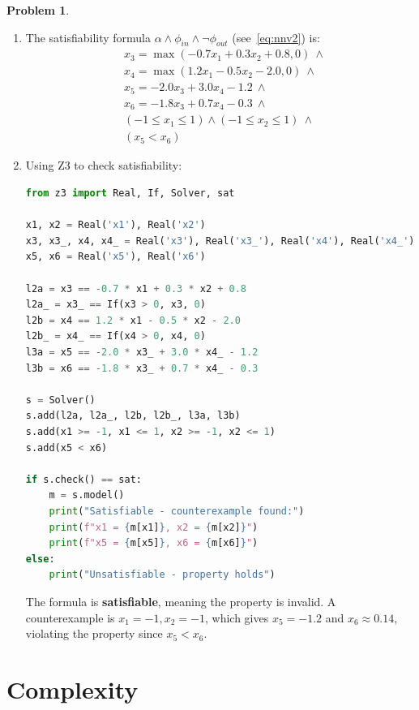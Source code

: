 \documentclass[oneside,11pt,dvipsnames]{book}
\numberwithin{equation}{section}
\theoremstyle{definition}
\newtheorem{problem}{Problem}[section]
\theoremstyle{remark}
\newenvironment{solution}{%
  \ifbool{showsol}{%
    \begin{mysolbox}%
        {\small \textbf{Solution}: }
  }{%
    \comment %
  }%
}{%
  \ifbool{showsol}{%
    \end{mysolbox}%
  }{%
    \endcomment %
  }%
}
\begin{document}
\begin{problem}
\begin{solution}
\begin{enumerate}
    \item The satisfiability formula $\alpha \land \phi_{in} \land \neg \phi_{out}$ (see~\autoref{eq:nnv2}) is:
    \begin{align*}
    & x_3 = \max(-0.7x_1 + 0.3x_2 + 0.8, 0) ~\land \\
    & x_4 = \max(1.2x_1 - 0.5x_2 - 2.0, 0) ~\land \\
    & x_5 = -2.0x_3 + 3.0x_4 - 1.2 ~\land \\
    & x_6 = -1.8x_3 + 0.7x_4 - 0.3 ~\land \\
    & (-1 \le x_1 \le 1) \land (-1 \le x_2 \le 1) ~\land \\
    & (x_5 < x_6)
    \end{align*}

    \item Using Z3 to check satisfiability:
\begin{lstlisting}[language=python,breaklines=true,basicstyle=\ttfamily\small]
from z3 import Real, If, Solver, sat

x1, x2 = Real('x1'), Real('x2')
x3, x3_, x4, x4_ = Real('x3'), Real('x3_'), Real('x4'), Real('x4_')
x5, x6 = Real('x5'), Real('x6')

l2a = x3 == -0.7 * x1 + 0.3 * x2 + 0.8
l2a_ = x3_ == If(x3 > 0, x3, 0)
l2b = x4 == 1.2 * x1 - 0.5 * x2 - 2.0
l2b_ = x4_ == If(x4 > 0, x4, 0)
l3a = x5 == -2.0 * x3_ + 3.0 * x4_ - 1.2
l3b = x6 == -1.8 * x3_ + 0.7 * x4_ - 0.3

s = Solver()
s.add(l2a, l2a_, l2b, l2b_, l3a, l3b)
s.add(x1 >= -1, x1 <= 1, x2 >= -1, x2 <= 1)
s.add(x5 < x6)

if s.check() == sat:
    m = s.model()
    print("Satisfiable - counterexample found:")
    print(f"x1 = {m[x1]}, x2 = {m[x2]}")
    print(f"x5 = {m[x5]}, x6 = {m[x6]}")
else:
    print("Unsatisfiable - property holds")
\end{lstlisting}

The formula is \textbf{satisfiable}, meaning the property is invalid. A counterexample is $x_1 = -1, x_2 = -1$, which gives $x_5 = -1.2$ and $x_6 \approx 0.14$, violating the property since $x_5 < x_6$.
\end{enumerate}
\end{solution}
\end{problem}

\section{Complexity}\label{sec:complexity}
\end{document}
